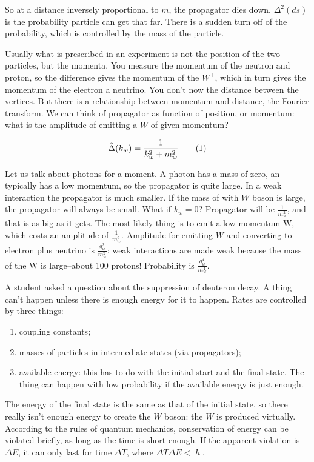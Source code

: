 \documentclass[]{article}
\newcommand\numberthis{\addtocounter{equation}{1}\tag{\theequation}}
\begin{document}
So at a distance inversely proportional to $m$, the propagator dies down.
$\Delta^2(ds)$ is the probability particle can get that far. There is a sudden turn off of the probability, which is controlled by the mass of the particle.

Usually what is prescribed in an experiment is not the position of the two particles, but the momenta. You measure the momentum of the neutron and proton, so the difference gives the momentum of the $W^+$, which in turn gives the momentum of the electron a neutrino. You don't now the distance between the vertices. But there is a relationship between momentum and distance, the Fourier transform. We can think of propagator as function of position, or momentum: what is the amplitude of emitting a $W$ of given momentum?

\begin{align*}
	\tilde{\Delta}(k_w)=\frac{1}{k_w^2+m_w^2} \numberthis \label{eq:Delta}
\end{align*}

Let us talk about photons for a moment. A photon has a mass of zero, an typically has a low momentum, so the propagator is quite large. In a weak interaction the propagator is much smaller. If the mass of with $W$ boson is large, the propagator will always be small. What if $k_w=0$? Propagator will be $\frac{1}{m_w^2}$, and that is as big as it gets. The most likely thing is to emit a low momentum W, which costs an amplitude of $\frac{1}{m_w^2}$. Amplitude for emitting $W$ and converting to electron plus neutrino is $\frac{g_w^2}{m_w^2}$: weak interactions are made weak because the mass of the W is large--about 100 protons! Probability is $\frac{g_w^4}{m_w^4}$.

A student asked a question about the suppression of  deuteron decay. A thing can't happen unless there is enough energy for it to happen. Rates are controlled by three things:
\begin{enumerate}
	\item coupling constants;
	\item masses of particles in intermediate states (via propagators);
	\item available energy: this has to do with the initial start and the final state. The thing can happen with low probability if the available energy is just enough.
\end{enumerate}

The energy of the final state is the same as that of the initial state, so there really isn't enough energy to create the $W$ boson: the $W$ is produced virtually. According to the rules of quantum mechanics, conservation of energy can be violated briefly, as long as the time is short enough. If the apparent violation is $\Delta E$, it can only last for time $\Delta T$, where $\Delta T \Delta E<\hslash$. 
 
\end{document}
